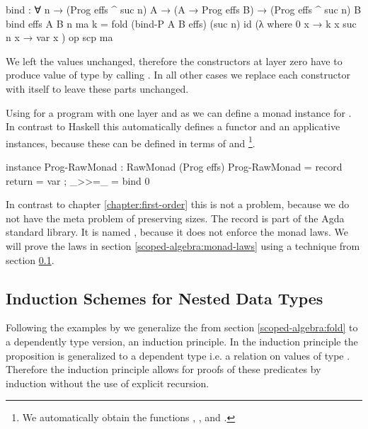 \begin{code}
bind : ∀ n → (Prog effs ^ suc n) A → (A → Prog effs B) →
  (Prog effs ^ suc n) B
bind {effs} {A} {B} n ma k = fold (bind-P A B effs) (suc n) id (λ where
    {0}      x → k x
    {suc n}  x → var x
  ) op scp ma
\end{code}
We left the values unchanged, therefore the 
constructors at layer zero have to produce value of type
\AgdaSpace{}\AgdaSpace{}
by calling .
In all other cases we replace each constructor with itself to leave these parts
unchanged.

Using \AgdaFunction{>>=} for a program with one layer and
 as  we can define a monad
instance for \AgdaSpace{}.
In contrast to Haskell this automatically defines a functor and an applicative
instances, because these can be defined in terms of \AgdaFunction{>>=} and
\footnote{We automatically obtain the functions
  \AgdaFunction{<\$>}, \AgdaFunction{<*>},  and
  \AgdaFunction{>>}. }.
\begin{code}
instance
  Prog-RawMonad : RawMonad (Prog effs)
  Prog-RawMonad = record { return = var ; _>>=_ = bind 0 }
\end{code}
In contrast to chapter \ref{chapter:first-order} this is not a problem, because
we do not have the meta problem of preserving sizes.
The record is part of the Agda standard library.
It is named , because it does not enforce the monad laws.
We will prove the laws in section \ref{scoped-algebra:monad-laws} using
a technique from section \ref{scoped-algebra:ind}.


\subsection{Induction Schemes for Nested Data Types}
\label{scoped-algebra:ind}

Following the examples by \textcite{DBLP:journals/corr/abs-1806-05230} we
generalize the  from section \ref{scoped-algebra:fold} to a
dependently type version, an induction principle.
In the induction principle the proposition  is generalized to a
dependent type i.e. a relation on values of type 
\AgdaSpace{}\AgdaSpace{}.
Therefore the induction principle allows for proofs of these predicates by
induction without the use of explicit recursion.

